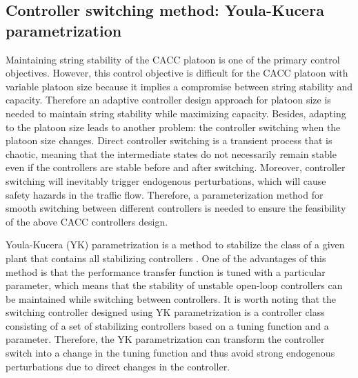 \documentclass[journal]{IEEEtran}
\begin{document}

\subsection{Controller switching method: Youla-Kucera parametrization}
\label{Section 3.2}

Maintaining string stability of the CACC platoon is one of the primary control objectives. However, this control objective is difficult for the CACC platoon with variable platoon size because it implies a compromise between string stability and capacity. Therefore an adaptive controller design approach for platoon size is needed to maintain string stability while maximizing capacity. Besides, adapting to the platoon size leads to another problem: the controller switching when the platoon size changes. Direct controller switching is a transient process that is chaotic, meaning that the intermediate states do not necessarily remain stable even if the controllers are stable before and after switching. Moreover, controller switching will inevitably trigger endogenous perturbations, which will cause safety hazards in the traffic flow. Therefore, a parameterization method for smooth switching between different controllers is needed to ensure the feasibility of the above CACC controllers design.

Youla-Kucera (YK) parametrization is a method to stabilize the class of a given plant that contains all stabilizing controllers \citep{dasgupta1996parametrization,navas2017youla}. One of the advantages of this method is that the performance transfer function is tuned with a particular parameter, which means that the stability of unstable open-loop controllers can be maintained while switching between controllers. It is worth noting that the switching controller designed using YK parametrization is a controller class consisting of a set of stabilizing controllers based on a tuning function and a parameter. Therefore, the YK parametrization can transform the controller switch into a change in the tuning function and thus avoid strong endogenous perturbations due to direct changes in the controller.
\end{document}
